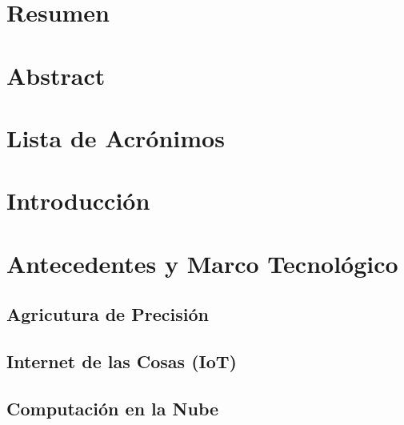 \documentclass[12pt]{article}
\begin{document}

\thispagestyle{empty}
\newpage

\section*{Resumen}

\newpage

\section*{Abstract}

\newpage

\tableofcontents{}
\newpage

\section*{Lista de Acrónimos}

\newpage

\section{Introducción}

\newpage

\section{Antecedentes y Marco Tecnológico}


\subsection{Agricutura de Precisión}


\subsection{Internet de las Cosas (IoT)}


\subsection{Computación en la Nube}

\end{document}
